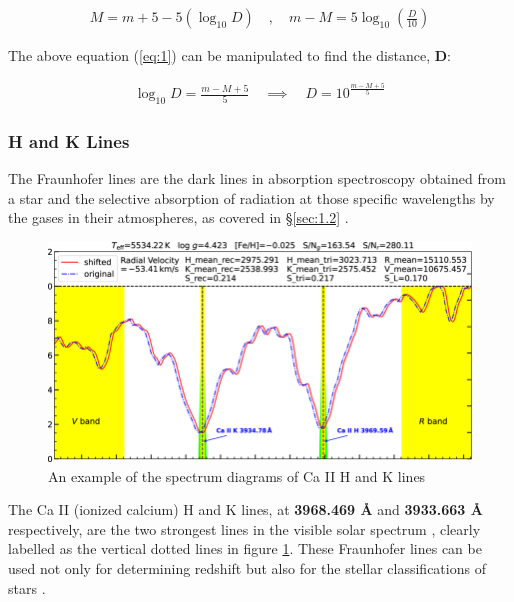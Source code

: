 \documentclass[12pt]{article}
\begin{document}
\begin{gather} \label{eq:1}
    M = m + 5 - 5 (\log_{10} D) \quad , \quad m - M = 5 \log_{10} \left( \frac{D}{10} \right)
\end{gather}

The above equation (\ref{eq:1}) can be manipulated to find the distance, \textbf{D}:

\begin{gather} \label{eq:2}
    \log_{10}D = \frac{m - M + 5}{5} \quad \implies \quad D = 10^{\frac{m - M + 5}{5}}
\end{gather}

\vspace{0.5cm}

\subsubsection{H and K Lines} \label{sec:1.2.2}

The Fraunhofer lines are the dark lines in absorption spectroscopy obtained from a star and the selective absorption of radiation at those specific wavelengths
by the gases in their atmospheres, as covered in §\ref{sec:1.2}
\cite{brithk}.

\begin{figure}[H]
    \centering
    \includegraphics[width=15cm]{handklines.png}
    \caption{\centering \footnotesize{An example of the spectrum diagrams of Ca II H and K lines \protect\cite{rgatehk}}}
    \label{fig:hklines}
\end{figure}

The Ca II (ionized calcium) H and K lines, at \textbf{3968.469 Å} and \textbf{3933.663 Å} respectively, are the two strongest lines in the visible solar spectrum
\cite{UCDhubble,aandahk}, clearly labelled as the vertical dotted lines in figure \ref{fig:hklines}.
These Fraunhofer lines can be used not only for determining redshift but also for the stellar classifications of stars
\cite{britstar}.
\end{document}
